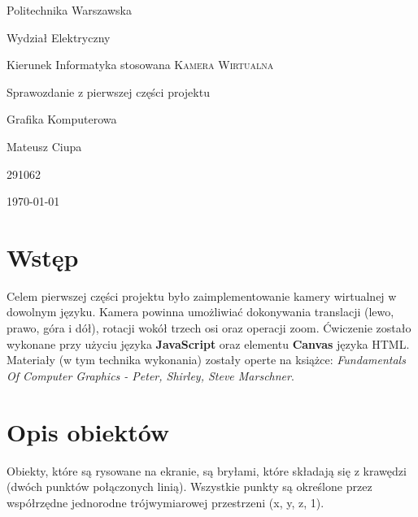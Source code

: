 \documentclass{article}
\begin{document}
\begin{titlepage}
    
    \begin{center}
        \Large
            Politechnika Warszawska 
        
            Wydział Elektryczny 
        
            Kierunek Informatyka stosowana
        \vfill
        \Huge \textsc{Kamera Wirtualna}
        
        \Large 
            Sprawozdanie z pierwszej części projektu
        
            Grafika Komputerowa
    \end{center}
    \vfill



    \begin{center}
        \Large 
            Mateusz Ciupa
        
            291062
    \end{center}

    \begin{center}
        \Large	\today
    \end{center}

\end{titlepage}

\tableofcontents

\newpage

\section{Wstęp}

    Celem pierwszej części projektu było zaimplementowanie kamery wirtualnej w dowolnym 
    języku. Kamera powinna umożliwiać dokonywania translacji (lewo, prawo, góra i dół), 
    rotacji wokół trzech osi oraz operacji zoom. Ćwiczenie zostało wykonane przy użyciu 
    języka \textbf{JavaScript} oraz elementu \textbf{Canvas} języka HTML. Materiały 
    (w tym technika wykonania) zostały operte na książce: \textit{Fundamentals Of Computer
    Graphics - Peter, Shirley, Steve Marschner}.

\section{Opis obiektów}

    Obiekty, które są rysowane na ekranie, są bryłami, które składają się z krawędzi
    (dwóch punktów połączonych linią). Wszystkie punkty są określone przez
    współrzędne jednorodne trójwymiarowej przestrzeni (x, y, z, 1).
\end{document}
